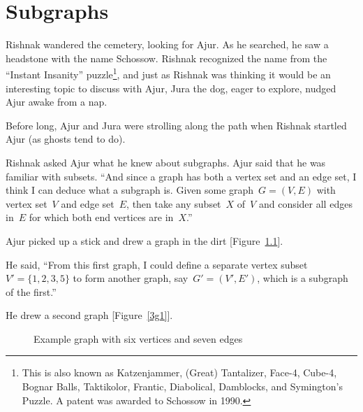 \chapter{Subgraphs}
Rishnak wandered the cemetery, looking for Ajur. As he searched, he saw a headstone with the name Schossow. Rishnak recognized the name from the ``Instant Insanity'' puzzle{\footnote{This is also known as Katzenjammer, (Great) Tantalizer, Face-4, Cube-4, Bognar Balls, Taktikolor, Frantic, Diabolical, Damblocks, and Symington's Puzzle. A patent was awarded to Schossow in 1990.}}, and just as Rishnak was thinking it would be an interesting topic to discuss with Ajur, Jura the dog, eager to explore, nudged Ajur awake from a nap.

Before long, Ajur and Jura were strolling along the path when Rishnak startled Ajur (as ghosts tend to do).

Rishnak asked Ajur what he knew about subgraphs. Ajur said that he was familiar with subsets. ``And since a graph has both a vertex set and an edge set, I think I can deduce what a subgraph  is. Given some graph~$G=(V,E)$ with vertex set~$V$ and edge set~$E$, then take any subset~$X$ of~$V$ and consider all edges in~$E$ for which both end vertices are in~$X$.''

Ajur picked up a stick and drew a graph in the dirt [Figure~\ref{3g}].

He said, ``From this first graph, I could define a separate vertex subset~$V'=\{1,2,3,5\}$ to form another graph, say~$G'=(V',E')$, which is a subgraph of the first.''

He drew a second graph [Figure~\ref{3g1}].

\begin{figure}
\begin{center}
\caption{Example graph with six vertices and seven edges}\label{3g}
\end{center}
\end{figure}


